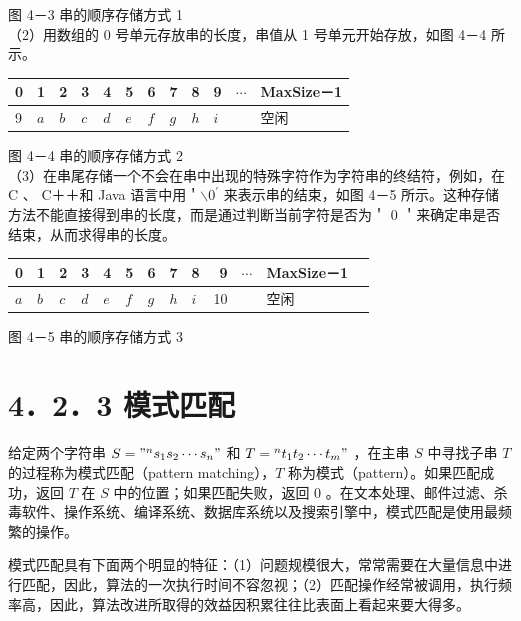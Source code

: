 \documentclass[10pt]{article}
\begin{document}
图 4－3 串的顺序存储方式 1\\
（2）用数组的 0 号单元存放串的长度，串值从 1 号单元开始存放，如图 4－4 所示。

\begin{center}
\begin{tabular}{|l|l|l|l|l|l|l|l|l|l|l|l|}
\hline
0 & 1 & 2 & 3 & 4 & 5 & 6 & 7 & 8 & 9 & $\cdots$ & MaxSize－1 \\
\hline
9 & $a$ & $b$ & $c$ & $d$ & $e$ & $f$ & $g$ & $h$ & $i$ &  & 空闲 \\
\hline
\end{tabular}
\end{center}

图 4－4 串的顺序存储方式 2\\
（3）在串尾存储一个不会在串中出现的特殊字符作为字符串的终结符，例如，在 C 、 C＋＋和 Java 语言中用＇$\backslash 0^{\prime}$ 来表示串的结束，如图 4－5 所示。这种存储方法不能直接得到串的长度，而是通过判断当前字符是否为＇ 0 ＇来确定串是否结束，从而求得串的长度。

\begin{center}
\begin{tabular}{|l|l|l|l|l|l|l|l|l|r|l|l|l|}
\multicolumn{1}{c}{0} & 1 & 2 & 3 & 4 & 5 & 6 & 7 & 8 & 9 & $\cdots$ & MaxSize－1 \\
\hline
$a$ & $b$ & $c$ & $d$ & $e$ & $f$ & $g$ & $h$ & $i$ & 10 &  & 空闲 \\
\hline
\end{tabular}
\end{center}

图 4－5 串的顺序存储方式 3

\section*{4．2．3 模式匹配}
给定两个字符串 $S="{ }^{n} s_{1} s_{2} \cdots s_{n} "$ 和 $T={ }^{n} t_{1} t_{2} \cdots t_{m} "$ ，在主串 $S$ 中寻找子串 $T$ 的过程称为模式匹配（pattern matching），$T$ 称为模式（pattern）。如果匹配成功，返回 $T$ 在 $S$ 中的位置；如果匹配失败，返回 0 。在文本处理、邮件过滤、杀毒软件、操作系统、编译系统、数据库系统以及搜索引擎中，模式匹配是使用最频繁的操作。

模式匹配具有下面两个明显的特征：（1）问题规模很大，常常需要在大量信息中进行匹配，因此，算法的一次执行时间不容忽视；（2）匹配操作经常被调用，执行频率高，因此，算法改进所取得的效益因积累往往比表面上看起来要大得多。
\end{document}

